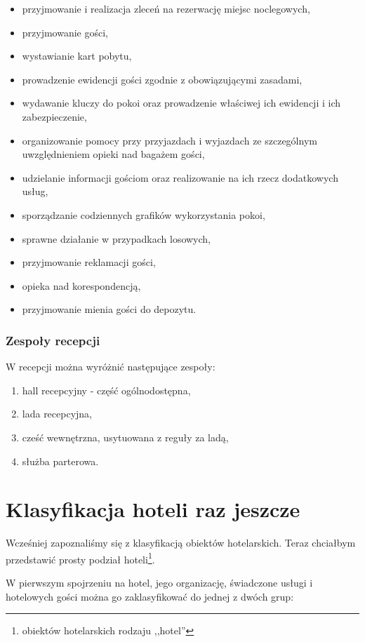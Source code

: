 \documentclass[a4paper,onecolumn,oneside,11pt,wide,floatssmall]{mwrep}
\theoremstyle{definition}
\theoremstyle{plain}%
\theoremstyle{remark}
\begin{document}
\begin{itemize}
  \item przyjmowanie i realizacja zleceń na rezerwację miejsc noclegowych,
  \item przyjmowanie gości,
  \item wystawianie kart pobytu,
  \item prowadzenie ewidencji gości zgodnie z obowiązującymi zasadami,
  \item wydawanie kluczy do pokoi oraz prowadzenie właściwej ich ewidencji i 
  ich zabezpieczenie,
  \item organizowanie pomocy przy przyjazdach i wyjazdach ze szczególnym 
  uwzględnieniem opieki nad bagażem gości,
  \item udzielanie informacji gościom oraz realizowanie na ich rzecz 
  dodatkowych usług,
  \item sporządzanie codziennych grafików wykorzystania pokoi,
  \item sprawne działanie w przypadkach losowych,
  \item przyjmowanie reklamacji gości,
  \item opieka nad korespondencją,
  \item przyjmowanie mienia gości do depozytu.
\end{itemize}

\subsubsection{Zespoły recepcji}
W recepcji można wyróżnić następujące zespoły\cite[8-10]{hotel2:part1}:
\begin{enumerate}
  \item hall recepcyjny - część ogólnodostępna,
  \item lada recepcyjna,
  \item cześć wewnętrzna, usytuowana z reguły za ladą,
  \item służba parterowa.
\end{enumerate}

\section{Klasyfikacja hoteli raz jeszcze}
Wcześniej zapoznaliśmy się z klasyfikacją obiektów hotelarskich. Teraz 
chciałbym przedstawić prosty podział hoteli\footnote{obiektów hotelarskich 
rodzaju ,,hotel''}.

W pierwszym spojrzeniu na hotel, jego organizację, świadczone usługi i 
hotelowych gości można go zaklasyfikować do jednej z dwóch grup:
\end{document}
